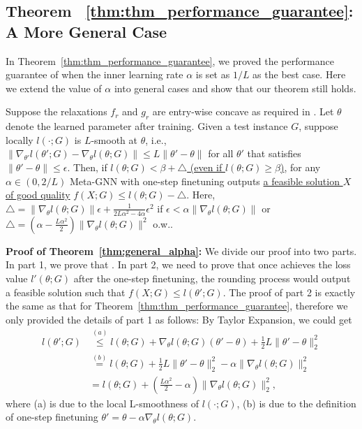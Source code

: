 \vspace{0.2cm}


\iffalse
\subsection{Theorem ~\ref{thm:thm_performance_guarantee}: A More General Case}
In Theorem~\ref{thm:thm_performance_guarantee}, we proved the performance guarantee of \proj when the inner learning rate $\alpha$ is set as $1/L$ as the best case. Here we extend the value of $\alpha$ into general cases and show that our theorem still holds.

\begin{theorem}
\label{thm:general_alpha2}
Suppose the relaxations $f_r$ and $g_r$ are entry-wise concave as required in \citep{wang2022unsupervised}. Let $\theta$ denote the learned parameter after training.  Given a test instance $G$, suppose locally $l(\cdot;G)$ is $L$-smooth at $\theta$, i.e., $\|\nabla_{\theta'} l(\theta';G) - \nabla_{\theta} l(\theta;G)\|\leq L\|\theta' - \theta\|$ for all $\theta'$ that satisfies $\|\theta' - \theta\|\leq \epsilon$. Then, if \underline{$l(\theta;G) < \beta + \triangle$ (even if $l(\theta;G) \geq \beta$)}, for any $\alpha \in (0, 2/L)$ Meta-GNN with one-step finetuning outputs \underline{a feasible solution $X$ of good quality} $f(X;G)\leq l(\theta;G)-\triangle$. Here, $\triangle = \|\nabla_{\theta} l(\theta;G)\| \epsilon + \frac{1}{2L\alpha^2 - 4\alpha}\epsilon^2$ if $\epsilon < \alpha \|\nabla_{\theta} l(\theta;G)\|$ or $\triangle = (\alpha - \frac{L\alpha^2}{2})\|\nabla_{\theta}l(\theta;G)\|^2$ o.w..
\end{theorem}

\textbf{Proof of Theorem~\ref{thm:general_alpha}:} We divide our proof into two parts. In part 1, we prove that . In part 2, we need to prove that once \proj achieves the loss value $l'(\theta;G)$ after the one-step finetuning, the rounding process would output a feasible solution such that $f(X;G)\leq l(\theta';G)$. The proof of part 2 is exactly the same as that for Theorem~\ref{thm:thm_performance_guarantee}, therefore we only provided the details of part 1 as follows:
By Taylor Expansion, we could get 
\begin{equation}
\begin{aligned}
l(\theta';G) 
& \stackrel{(a)}{\leq} l(\theta;G) + \nabla_{\theta}l(\theta;G)(\theta'-\theta) + \frac{1}{2}L \| \theta' - \theta\|_2^2\\
& \stackrel{(b)}{=} l(\theta;G) + \frac{1}{2}L\|\theta' - \theta\|_2^2 - \alpha \|\nabla_{\theta} l(\theta;G)\|_2^2 \\
&  = l(\theta;G)+ (\frac{L\alpha^2}{2} - \alpha) \|\nabla_{\theta} l(\theta;G)\|_2^2,
\end{aligned}
\end{equation}
where (a) is due to the local L-smoothness of $l(\cdot;G)$, (b) is due to the definition of one-step finetuning $\theta' = \theta - \alpha \nabla_{\theta}l(\theta;G)$.

